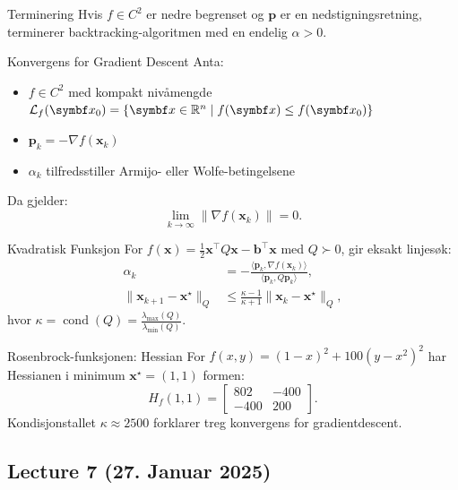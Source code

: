 \begin{lemma}{Terminering}{}
    Hvis \( f \in C^2 \) er nedre begrenset og \( \bm{p} \) er en nedstigningsretning, terminerer backtracking-algoritmen med en endelig \( \alpha > 0 \).
\end{lemma}

\begin{theorem}{Konvergens for Gradient Descent}{}
    Anta:
    \begin{itemize}
        \item \( f \in C^2 \) med kompakt nivåmengde \( \mathcal{L}_f(\bm{x}_0) = \{\bm{x} \in \R^n \mid f(\bm{x}) \leq f(\bm{x}_0)\} \)
        \item \( \bm{p}_k = -\nabla f(\bm{x}_k) \)
        \item \( \alpha_k \) tilfredsstiller Armijo- eller Wolfe-betingelsene
    \end{itemize}
    Da gjelder:
    \[
        \lim_{k \to \infty} \|\nabla f(\bm{x}_k)\| = 0.
    \]
\end{theorem}

\begin{example}{Kvadratisk Funksjon}{}
    For \( f(\bm{x}) = \frac{1}{2} \bm{x}^\top Q \bm{x} - \bm{b}^\top \bm{x} \) med \( Q \succ 0 \), gir eksakt linjesøk:
    \begin{align*}
        \alpha_k                             & = -\frac{\langle \bm{p}_k, \nabla f(\bm{x}_k) \rangle}{\langle \bm{p}_k, Q \bm{p}_k \rangle}, \\
        \|\bm{x}_{k+1} - \bm{x}^\star\|_Q & \leq \frac{\kappa - 1}{\kappa + 1} \|\bm{x}_k - \bm{x}^\star\|_Q,
    \end{align*}
    hvor \( \kappa = \operatorname{cond}(Q) = \frac{\lambda_{\max}(Q)}{\lambda_{\min}(Q)} \).
\end{example}

\begin{example}{Rosenbrock-funksjonen: Hessian}{}
    For \( f(x,y) = (1 - x)^2 + 100(y - x^2)^2 \) har Hessianen i minimum \( \bm{x}^\star = (1,1) \) formen:
    \[
        H_f(1,1) = \begin{bmatrix} 802 & -400 \\ -400 & 200 \end{bmatrix}.
    \]
    Kondisjonstallet \( \kappa \approx 2500 \) forklarer treg konvergens for gradientdescent.
\end{example}


\subsection{Lecture 7 (27. Januar 2025)}

